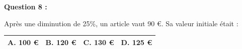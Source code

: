 \documentclass[12pt,a4paper]{article}
\begin{document}
\vspace{0.7cm}

\textbf{Question 8 :} 
\vspace{5pt}

Après une diminution de 25\%, un article vaut 90 €.  
Sa valeur initiale était : 
\vspace{0.3cm}

\renewcommand{\arraystretch}{3} 
\begin{tabular}{|m{3.4cm}|m{3.4cm}|m{3.4cm}|m{3.4cm}|}
\hline
\centering \vspace{-0.3cm} \textbf{A.} 100 € & 
\centering \vspace{-0.3cm} \textbf{B.} 120 € & 
\centering \vspace{-0.3cm} \textbf{C.} 130 € & 
\centering \vspace{-0.3cm} \textbf{D.} 125 € \tabularnewline
\hline
\end{tabular}






\vspace{0.7cm}
\end{document}
